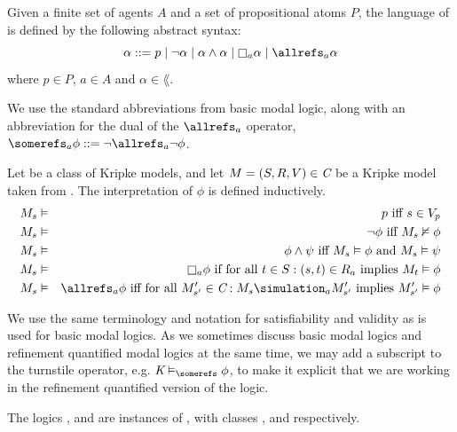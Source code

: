 \begin{definition}
Given a finite set of agents $A$ and a set of propositional atoms $P$, the
language of \langF{} is defined by the following abstract syntax:
$$
\alpha ::=  p \bnfalt
            \neg \alpha \bnfalt
            \alpha \land \alpha \bnfalt
            \knows_a \alpha \bnfalt
            \allrefs_a \alpha
$$
where $p \in P$, $a \in A$ and $\alpha \in \lang{}$.
\end{definition}

We use the standard abbreviations from basic modal logic, along with an
abbreviation for the dual of the $\allrefs_a$ operator, $\somerefs_a \phi ::=
\neg \allrefs_a \neg \phi$.

\begin{definition}
Let \classC{} be a class of Kripke models, and let $M = (S, R, V) \in \textit{C}$
be a Kripke model taken from \classC{}. The interpretation of $\phi$ is defined
inductively.
\begin{eqnarray*}
M_s &\entails& p \text{ iff } s \in V_p\\
M_s &\entails& \neg \phi \text{ iff } M_s \nentails \phi\\
M_s &\entails& \phi \land \psi \text{ iff } M_s \entails \phi \text{ and } M_s
\entails \psi\\
M_s &\entails& \knows_a \phi \text{ if for all } t \in S : (s, t) \in R_a \text{
implies } M_t \entails \phi\\
M_s &\entails& \allrefs_a \phi \text{ iff for all } M'_{s'} \in \classC : M_s
\simulation_a M'_{s'} \text{ implies } M'_{s'} \entails \phi
\end{eqnarray*}
\end{definition}

We use the same terminology and notation for satisfiability and validity as is
used for basic modal logics. As we sometimes discuss basic modal logics and
refinement quantified modal logics at the same time, we may add a subscript to
the turnstile operator, e.g. $\classK \entails_\somerefs \phi$, to make it
explicit that we are working in the refinement quantified version of the logic.

The logics \logicKF{}, \logicKDF{} and \logicSF{} are instances of \logicCF{},
with classes \classK{}, \classKD{} and \classS{} respectively. 

